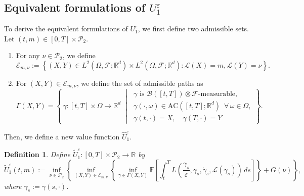 \documentclass[reqno,11pt]{amsart}
\newtheorem{definition}[theorem]{Definition}
\numberwithin{equation}{section}
\newcommand{\e}{\varepsilon}
\newcommand{\ep}{\varepsilon}
\renewcommand{\hat}{\widehat}
\begin{document}
\subsection{Equivalent formulations of $U^\ep_1$}\label{formulations}
To derive the equivalent formulations of $U^\e_1$, we first define two admissible sets. Let $(t,m) \in [0,T] \times \mathcal{P}_2$.
\begin{enumerate}
\item For any $\nu\in \mathcal{P}_2$, we define
\[
\mathcal{E}_{m,\nu}
:=
\left\{
(X,Y)\in L^2(\Omega,\mathcal{F};\mathbb{R}^d)
\times
L^2(\Omega,\mathcal{F};\mathbb{R}^d): \mathcal{L}(X)=m,\mathcal{L}(Y)=\nu
\right\}.
\]

\item For $(X, Y) \in \mathcal{E}_{m, \nu}$, we define the set of admissible paths as
\begin{equation}\label{eqn:gammaxy}
\Gamma(X, Y) = \left\{\,\gamma:[t,T]\times \Omega \to \mathbb{R}^d\;\middle|\;
\begin{array}{l}
\gamma \text{ is } \mathcal{B}([t,T]) \otimes \mathcal{F}\text{-measurable},\\[4pt]
\gamma(\cdot,\omega)\in \text{AC}([t,T];\mathbb{R}^d) \,\,\, \forall \, \omega \in \Omega,\\[4pt]
 \gamma(t,\cdot)=X,\quad \gamma(T,\cdot)=Y
\end{array}
\right\}.
\end{equation}
\end{enumerate}
Then, we define a new value function $\hat{U}_1^\ep$.


\begin{definition}
Define $\tilde{U}_1^\varepsilon : [0,T] \times \mathcal{P}_2 \to \mathbb{R}$ by
\begin{equation}\label{eqn:Uep1h}
\tilde{U}_1^\varepsilon(t,m)
:= \inf_{\nu \in \mathcal{P}_2}
\left\{ \inf_{(X, Y) \in \mathcal{E}_{m,\nu}}
\left\{
\inf_{\gamma \in\Gamma(X, Y)}
\mathbb{E}\left[
\int_{t}^T
L\left(
\frac{\gamma_s}{\e},
\gamma_s,
\dot{\gamma}_s,
\mathcal{L}(\gamma_s)
\right)\, ds
\right]
\right\}+G(\nu)
\right\},
\end{equation}
where $\gamma_s:=\gamma(s,\cdot)$.
\end{definition}
\end{document}
